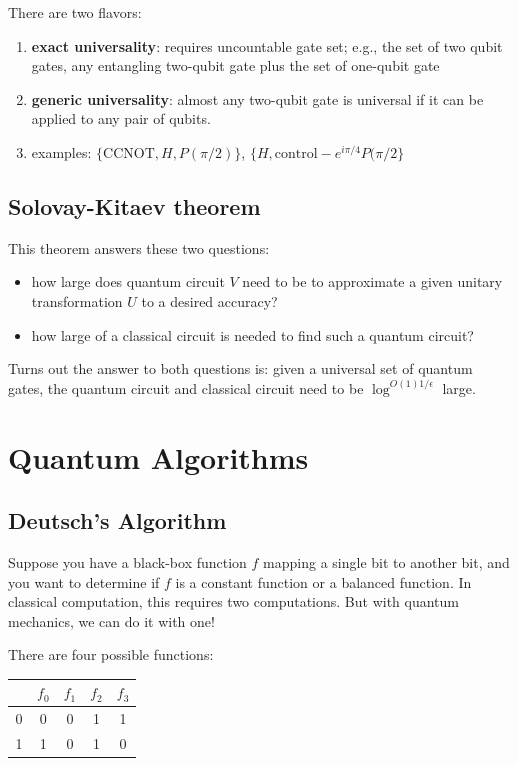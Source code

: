 \documentclass[11pt]{article}
\begin{document}
There are two flavors:

\begin{enumerate}
	\item
	      \textbf{exact universality}: requires uncountable gate set; e.g., the set of two qubit gates, any entangling two-qubit gate plus the set of one-qubit gate
	\item
	      \textbf{generic universality}: almost any two-qubit gate is universal if it can be applied to any pair of qubits.
	\item
	      examples: $\{\text{CCNOT}, H, P(\pi/2)\}$, $\{H, \text{control} - e^{i\pi/4}P(\pi/2\}$
\end{enumerate}


\subsection{Solovay-Kitaev theorem}

This theorem answers these two questions:

\begin{itemize}
	\item how large does quantum circuit $V$ need to be to approximate a given unitary transformation $U$ to a desired accuracy?
	\item how large of a classical circuit is needed to find such a quantum circuit?
\end{itemize}

Turns out the answer to both questions is: given a universal set of quantum gates, the quantum circuit and classical circuit need to be  $\log^{O(1)1/\epsilon}$ large.

\section{Quantum Algorithms}

\subsection{Deutsch's Algorithm}

Suppose you have a black-box function $f$ mapping a single bit to another bit, and you want to determine if $f$ is a constant function or a balanced function. In classical computation, this requires two computations. But with quantum mechanics, we can do it with one!

There are four possible functions:

\begin{center}
  \begin{tabular}{c|c|c|c|c}
    \  & $f_0$ & $f_1$ & $f_2$ & $f_3$ \\
    \hline
    0  & 0     & 0     & 1     & 1     \\
    1  & 1     & 0     & 1     & 0     \\
  \end{tabular}
\end{center}
\end{document}
